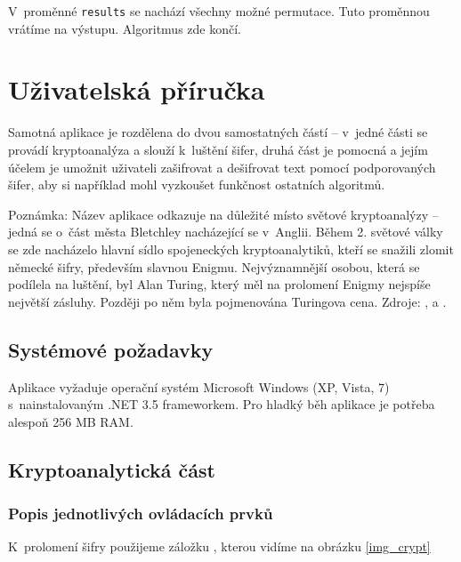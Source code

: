 \documentclass[12pt]{article}
\theoremstyle{definition}
\newcommand{\var}[1]{\texttt{#1}}
\begin{document}
V~proměnné \var{results} se nachází všechny možné permutace. Tuto proměnnou vrátíme na výstupu. Algoritmus zde končí. 




\newpage
\section{Uživatelská příručka}
Samotná aplikace je rozdělena do dvou samostatných částí -- v~jedné části se provádí kryptoanalýza a slouží k~luštění šifer, druhá část je pomocná a jejím účelem je umožnit uživateli zašifrovat a dešifrovat text pomocí podporovaných šifer, aby si například mohl vyzkoušet funkčnost ostatních algoritmů. 

Poznámka: Název aplikace  odkazuje na důležité místo světové kryptoanalýzy -- jedná se o~část města Bletchley nacházející se v~Anglii. Během 2. světové války se zde nacházelo hlavní sídlo spojeneckých kryptoanalytiků, kteří se snažili zlomit německé šifry, především slavnou Enigmu. Nejvýznamnější osobou, která se podílela na luštění, byl Alan Turing, který měl na prolomení Enigmy nejspíše největší zásluhy. Později po něm byla pojmenována Turingova cena. Zdroje: \cite{park}, \cite{turing} a \cite{singh}.

\subsection{Systémové požadavky}
Aplikace vyžaduje operační systém Microsoft Windows (XP, Vista, 7) s~nainstalovaným .NET 3.5 frameworkem. Pro hladký běh aplikace je potřeba alespoň 256 MB RAM. 


\subsection{Kryptoanalytická část}
\subsubsection{Popis jednotlivých ovládacích prvků}

K~prolomení šifry použijeme záložku , kterou vidíme na obrázku \ref{img_crypt}
\end{document}
